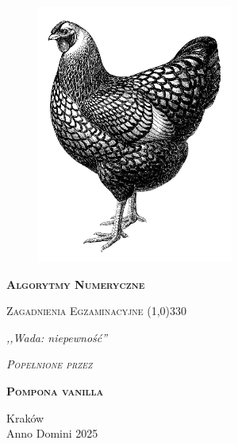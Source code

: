 \begin{titlepage}
	\begin{center}
		\begin{figure}[h]
			\centering
			\includegraphics[]{img/kura.png}

		\end{figure}

		\Huge
		\textbf{\textsc{Algorytmy Numeryczne}}

		\vspace{0.5cm}
		\Large
		\textsc{Zagadnienia Egzaminacyjne}
		\line(1,0){330}

		\normalsize

		\vspace{1cm}
		\textit{,,Wada: niepewność''}
		\vspace{1cm}

		\textit{\textsc{Popełnione przez}}\\
		\vspace{5mm}

		\textbf{\textsc{Pompona vanilla}}

		\vfill

		Kraków \\
		Anno Domini 2025
	\end{center}
\end{titlepage}
